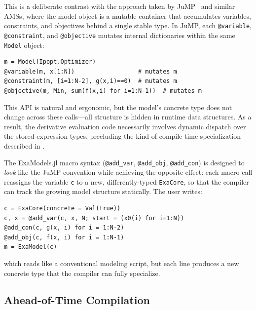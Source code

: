 \documentclass[11pt]{article}
\begin{document}
This is a deliberate contrast with the approach taken by JuMP~\citep{lubinJuMP10Recent2023} and similar AMSs, where the model object is a mutable container that accumulates variables, constraints, and objectives behind a single stable type. In JuMP, each \texttt{@variable}, \texttt{@constraint}, and \texttt{@objective} mutates internal dictionaries within the same \texttt{Model} object:
\begin{lstlisting}
m = Model(Ipopt.Optimizer)
@variable(m, x[1:N])                  # mutates m
@constraint(m, [i=1:N-2], g(x,i)==0)  # mutates m
@objective(m, Min, sum(f(x,i) for i=1:N-1))  # mutates m
\end{lstlisting}
This API is natural and ergonomic, but the model's concrete type does not change across these calls---all structure is hidden in runtime data structures. As a result, the derivative evaluation code necessarily involves dynamic dispatch over the stored expression types, precluding the kind of compile-time specialization described in .

The ExaModels.jl macro syntax (\texttt{@add\_var}, \texttt{@add\_obj}, \texttt{@add\_con}) is designed to \emph{look} like the JuMP convention while achieving the opposite effect: each macro call reassigns the variable \texttt{c} to a new, differently-typed \texttt{ExaCore}, so that the compiler can track the growing model structure statically. The user writes:
\begin{lstlisting}
c = ExaCore(concrete = Val(true))
c, x = @add_var(c, x, N; start = (x0(i) for i=1:N))
@add_con(c, g(x, i) for i = 1:N-2)
@add_obj(c, f(x, i) for i = 1:N-1)
m = ExaModel(c)
\end{lstlisting}
which reads like a conventional modeling script, but each line produces a new concrete type that the compiler can fully specialize.

\subsection{Ahead-of-Time Compilation}
\label{sec:aot:juliac}
\end{document}
